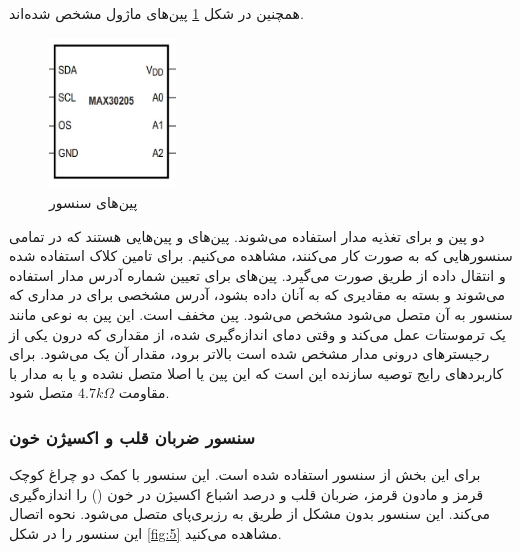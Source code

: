 همچنین در شکل \ref{fig:15} پین‌های ماژول  مشخص شده‌اند.

\begin{figure}[h]
	\centering
	\includegraphics[width=0.3\textwidth]{figs/MAX30205-2.jpg}
	
	\caption{پین‌های سنسور }
	\label{fig:15}
\end{figure}


دو پین  و  برای تغذیه مدار استفاده می‌شوند. پین‌های  و  پین‌هایی هستند که در تمامی سنسور‌هایی که به صورت  کار می‌کنند، مشاهده می‌کنیم.  برای تامین کلاک استفاده شده و انتقال داده از طریق  صورت می‌گیرد. پین‌های 
برای تعیین شماره آدرس  مدار استفاده می‌شوند و بسته به مقادیری که به آنان داده بشود، آدرس‌ مشخصی برای  در مداری که سنسور به آن متصل می‌شود مشخص می‌شود. پین  مخفف 
است. این پین به نوعی مانند یک ترموستات عمل می‌کند و وقتی دمای اندازه‌گیری شده، از مقداری که درون یکی از رجیستر‌های درونی مدار مشخص شده است بالاتر برود، مقدار آن یک می‌شود. برای کاربرد‌های رایج توصیه سازنده این است که این پین یا اصلا متصل نشده و یا به مدار  با مقاومت $4.7k\Omega$ متصل شود.

\subsubsection{سنسور ضربان قلب و اکسیژن خون}


برای این بخش از سنسور  استفاده شده است. این سنسور با کمک دو چراغ کوچک قرمز و مادون قرمز، ضربان قلب و درصد اشباع اکسیژن در خون () را اندازه‌گیری می‌کند. این سنسور بدون مشکل از طریق  به رزبری‌پای متصل می‌شود. نحوه اتصال این سنسور را در شکل \ref{fig:5} مشاهده می‌کنید.

